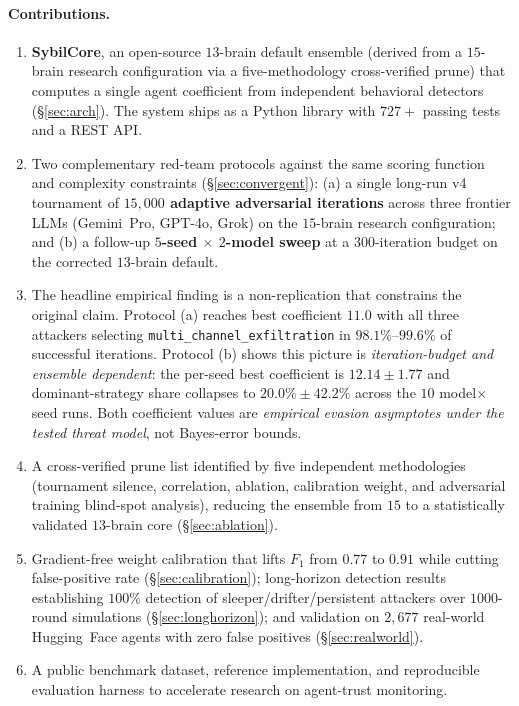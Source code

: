 \documentclass{article}
\begin{document}
\paragraph{Contributions.}
\begin{enumerate}
\item \textbf{SybilCore}, an open-source $13$-brain default ensemble
  (derived from a $15$-brain research configuration via a five-methodology
  cross-verified prune) that computes a single agent coefficient from
  independent behavioral detectors (\S\ref{sec:arch}). The system ships
  as a Python library with $727\!+\!$ passing tests and a REST API.
\item Two complementary red-team protocols against the same scoring
  function and complexity constraints
  (\S\ref{sec:convergent}): (a) a single long-run v4 tournament of
  \textbf{$15{,}000$ adaptive adversarial iterations} across three
  frontier LLMs (Gemini~Pro, GPT-4o, Grok) on the $15$-brain research
  configuration; and (b) a follow-up \textbf{$5$-seed $\times$ $2$-model
  sweep} at a $300$-iteration budget on the corrected $13$-brain default.
\item The headline empirical finding is a non-replication that
  constrains the original claim. Protocol (a) reaches best coefficient
  $11.0$ with all three attackers selecting
  \texttt{multi\_channel\_exfiltration} in $98.1\%$--$99.6\%$ of
  successful iterations. Protocol (b) shows
  this picture is \emph{iteration-budget and ensemble dependent}: the
  per-seed best coefficient is $12.14 \pm 1.77$ and dominant-strategy
  share collapses to $20.0\% \pm 42.2\%$ across the $10$ model$\times$seed
  runs. Both coefficient values are \emph{empirical evasion asymptotes
  under the tested threat model}, not Bayes-error bounds.
\item A cross-verified prune list identified by five independent
  methodologies (tournament silence, correlation, ablation,
  calibration weight, and adversarial training blind-spot analysis),
  reducing the ensemble from $15$ to a statistically validated
  $13$-brain core (\S\ref{sec:ablation}).
\item Gradient-free weight calibration that lifts $F_1$ from $0.77$ to
  $0.91$ while cutting false-positive rate (\S\ref{sec:calibration});
  long-horizon detection results establishing $100\%$ detection of
  sleeper/drifter/persistent attackers over $1000$-round simulations
  (\S\ref{sec:longhorizon}); and validation on $2{,}677$ real-world
  Hugging~Face agents with zero false positives (\S\ref{sec:realworld}).
\item A public benchmark dataset, reference implementation, and
  reproducible evaluation harness to accelerate research on agent-trust
  monitoring.
\end{enumerate}
\end{document}
